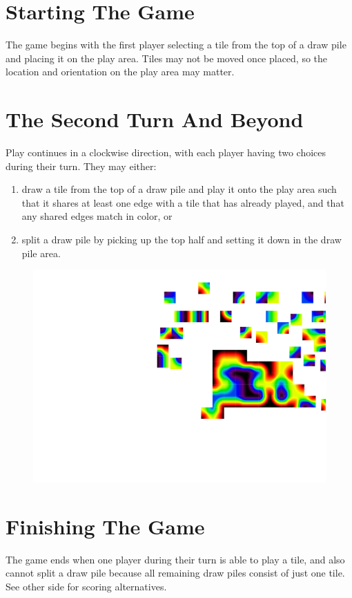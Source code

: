 \documentclass[twocolumn, 11pt]{article}
\begin{document}
\section*{Starting The Game}
The game begins with the first player selecting a tile from the top of
a draw pile and placing it on the play area.  Tiles may not be moved
once placed, so the location and orientation on the play area may
matter.

\section*{The Second Turn And Beyond}
Play continues in a clockwise direction, with each player having two
choices during their turn.  They may either:
\begin{enumerate}
\item draw a tile from the top of a draw pile and play it onto the play area such that it shares at least one edge with a tile that has already played, and that any shared edges match in color,
or
\item split a draw pile by picking up the top half and setting it down
  in the draw pile area.
\end{enumerate}
\begin{figure}[th]
  \includegraphics[width=\columnwidth]{play-example}
\end{figure}

\section*{Finishing The Game}
The game ends when one player during their turn is able to play a
tile, and also cannot split a draw pile because all remaining draw
piles consist of just one tile.  See other side for scoring
alternatives.
\end{document}
